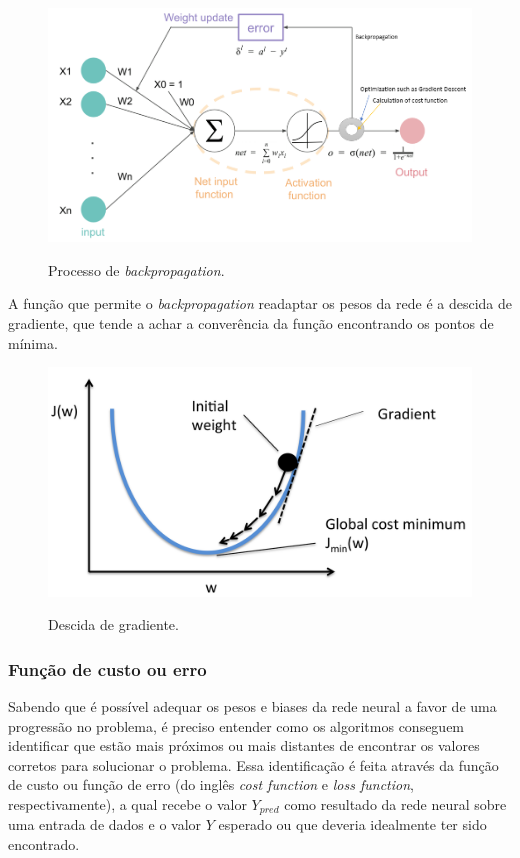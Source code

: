 \begin{figure}[H]
  \centering
  \caption{Processo de \textit{backpropagation}.}
  \includegraphics[scale=0.4]{figuras/backprop.png}
  \label{fig:backprop}
\end{figure}

A função que permite o \textit{backpropagation} readaptar os pesos da rede é a descida de gradiente, que tende a achar a converência da função encontrando os pontos de mínima.

\begin{figure}[H]
  \centering
  \caption{Descida de gradiente.}
  \includegraphics[scale=0.2]{figuras/gradient-descent.png}
  \label{fig:gradient-descent}
\end{figure}


\subsubsection{Função de custo ou erro} \label{sssec:cost-function}

Sabendo que é possível adequar os pesos e biases da rede neural a favor de uma progressão no problema, é preciso entender como os algoritmos conseguem identificar que estão mais próximos ou mais distantes de encontrar os valores corretos para solucionar o problema. Essa identificação é feita através da função de custo ou função de erro (do inglês \textit{cost function} e \textit{loss function}, respectivamente), a qual recebe o valor $Y_{pred}$ como resultado da rede neural sobre uma entrada de dados e o valor $Y$ esperado ou que deveria idealmente ter sido encontrado.

